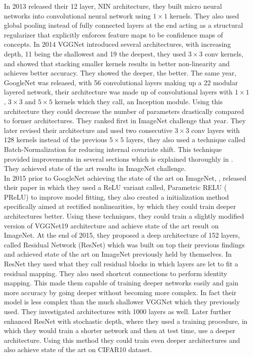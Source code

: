\documentclass{article} \usepackage{lets_keepit_simple,times}
\begin{document}
In 2013 \cite{Lin_NIN_2013} released their 12 layer, NIN architecture, they built micro neural networks into convolutional neural network using $1 \times 1$ kernels. They also used global pooling instead of fully connected layers at the end acting as a structural regularizer that explicitly enforces feature maps to be confidence maps of concepts. In 2014 VGGNet \cite{Simonyan_VGG_2014} introduced several architectures, with increasing depth, 11 being the shallowest and 19 the deepest, they used $3 \times 3$ conv kernels, and showed that stacking smaller kernels results in better non-linearity and achieves better accuracy. They showed the deeper, the better. The same year, GoogleNet \cite{Szegedy_googlenet_2015} was released, with 56 convolutional layers making up a 22 modular layered network, their architecture was made up of convolutional layers with $1 \times 1$, $3 \times 3$ and $5 \times 5$ kernels which they call, an Inception module. Using this architecture they could decrease the number of parameters drastically compared to former architectures. They ranked first in ImageNet challenge that year. They later revised their architecture and used two consecutive $3 \times 3$ conv layers with 128 kernels instead of the previous $5 \times 5$ layers, they also used a technique called Batch-Normalization \cite{Ioffe_BatchNorm_incepv2_2015} for reducing internal covariate shift. This technique provided improvements in several sections which is explained thoroughly in \cite{Ioffe_BatchNorm_incepv2_2015}. They achieved state of the art results in ImageNet challenge.\\ 
In 2015 prior to GoogleNet achieving the state of the art on ImageNet, \cite{He_PReLU_2015}, released their paper in which they used a ReLU variant called, Parametric RELU ( PReLU) to improve model fitting, they also created a initialization method specifically aimed at rectified nonlinearities, by which they could train deeper architectures better. Using these techniques, they could train a slightly modified version of VGGNet19 \cite{Simonyan_VGG_2014} architecture and achieve state of the art result on ImageNet. At the end of 2015, they proposed a deep architecture of 152 layers, called Residual Network (ResNet) \cite{He_ResNet_2015} which was built on top their previous findings and achieved state of the art on ImageNet previously held by themselves. In ResNet they used what they call residual blocks in which layers are let to fit a residual mapping. They also used shortcut connections to perform identity mapping. This made them capable of training deeper networks easily and gain more accuracy by going deeper without becoming more complex. In fact their model is less complex than the much shallower VGGNet \cite{Simonyan_VGG_2014} which they previously used. They investigated architectures with 1000 layers as well. Later \cite{Huang_DeepNN_StochDepth_2016} further enhanced ResNet with stochastic depth, where they used a training procedure, in which they would train a shorter network and then at test time, use a deeper architecture. Using this method they could train even deeper architectures and also achieve state of the art on CIFAR10 dataset.\\ 
\end{document}
